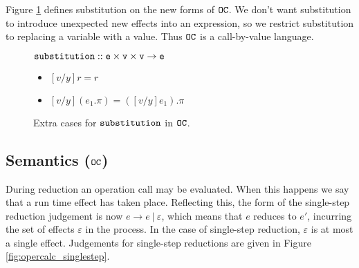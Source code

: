 Figure \ref{fig:opercalc_sub_defn} defines substitution on the new forms of $\mathtt{OC}$.
We don't want substitution to introduce unexpected new effects into an expression, so we restrict substitution to replacing a variable with a  value.
Thus $\mathtt{OC}$ is a call-by-value language.

\begin{figure}[h]

$\mathtt{substitution :: e \times v \times v \rightarrow e}$

\begin{itemize}
	\item[] $[v/y]r = r$
	\item[] $[v/y](e_1.\pi) = ([v/y]e_1).\pi$
\end{itemize}

\vspace{-7pt}
\caption{Extra cases for $\mathtt{substitution}$ in $\mathtt{OC}$.}
\label{fig:opercalc_sub_defn}
\end{figure}


\subsection{Semantics ($\mathtt{OC}$)}

During reduction an operation call may be evaluated. When this happens we say that a run time effect has taken place. Reflecting this, the form of the single-step reduction judgement is now $e \longrightarrow e~|~\varepsilon$, which means that $e$ reduces to $e'$, incurring the set of effects $\varepsilon$ in the process. In the case of single-step reduction, $\varepsilon$ is at most a single effect. Judgements for single-step reductions are given in Figure \ref{fig:opercalc_singlestep}.

